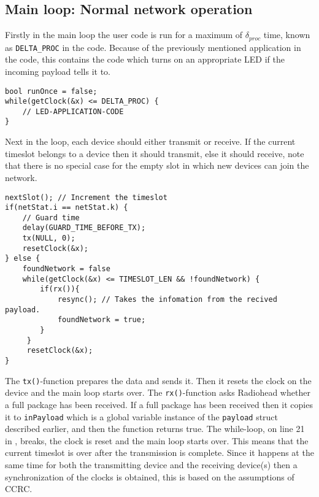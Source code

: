 \subsection{Main loop: Normal network operation}
Firstly in the main loop the user code is run for a maximum of $\delta_{proc}$ time, known as \texttt{DELTA\_PROC} in the code.
Because of the previously mentioned application in the code, this contains the code which turns on an appropriate LED if the incoming payload tells it to. 

\begin{lstlisting}[style=customc,caption={While-loop with application code.},label={lst:ccrc:usercode}]
bool runOnce = false;
while(getClock(&x) <= DELTA_PROC) {
    // LED-APPLICATION-CODE
}
\end{lstlisting}

Next in the loop, each device should either transmit or receive. 
If the current timeslot belongs to a device then it should transmit, else it should receive, note that there is no special case for the empty slot in which new devices can join the network. 

\begin{lstlisting}[style=customc,caption={Main loop deciding whether to transmit or receive.},label={lst:ccrc:rxortx}]
nextSlot(); // Increment the timeslot
if(netStat.i == netStat.k) {
    // Guard time
    delay(GUARD_TIME_BEFORE_TX);
    tx(NULL, 0);
    resetClock(&x);
} else {
    foundNetwork = false
    while(getClock(&x) <= TIMESLOT_LEN && !foundNetwork) {
        if(rx()){
            resync(); // Takes the infomation from the recived payload.
            foundNetwork = true;
        }
     }
     resetClock(&x);
}
\end{lstlisting}

The \texttt{tx()}-function prepares the data and sends it.
Then it resets the clock on the device and the main loop starts over.
The \texttt{rx()}-function asks Radiohead whether a full package has been received. 
If a full package has been received then it copies it to \texttt{inPayload} which is a global variable instance of the \texttt{payload} struct described earlier, and then the function returns true.
The while-loop, on line 21 in , breaks, the clock is reset and the main loop starts over. 
This means that the current timeslot is over after the transmission is complete.
Since it happens at the same time for both the transmitting device and the receiving device(s) then a synchronization of the clocks is obtained, this is based on the assumptions of CCRC. 